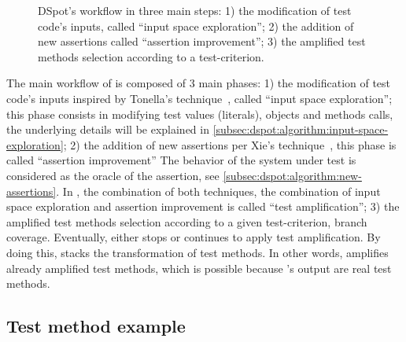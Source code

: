 \begin{figure}[h]
	\centering{}
	\caption{DSpot's workflow in three main steps: 
		1) the modification of test code's inputs, called ``input space exploration''; 
		2) the addition of new assertions called ``assertion improvement''; 
		3) the amplified test methods selection according to a test-criterion.
	}
	\label{fig:dspot-workflow}
\end{figure}

The main workflow of \dspot is composed of 3 main phases:
1) the modification of test code's inputs inspired by Tonella's technique~\cite{tonella}, called ``input space exploration''; 
this phase consists in modifying test values (\eg literals), objects and methods calls, the underlying details will be explained in \autoref{subsec:dspot:algorithm:input-space-exploration};
2) the addition of new assertions per Xie's technique~\cite{Xie2006}, this phase is called ``assertion improvement''
The behavior of the system under test is considered as the oracle of the assertion, see \autoref{subsec:dspot:algorithm:new-assertions}.
In \dspot, the combination of both techniques, \ie the combination of input space exploration and assertion improvement is called ``test amplification'';
3) the amplified test methods selection according to a given test-criterion, \eg branch coverage.
Eventually, \dspot either stops or continues to apply test amplification.
By doing this, \dspot stacks the transformation of test methods.
In other words, \dspot amplifies already amplified test methods, which is possible because \dspot's output are real test methods.

\subsection{Test method example}
\label{subsec:dspot:overview:appliance-to-unit-test}

